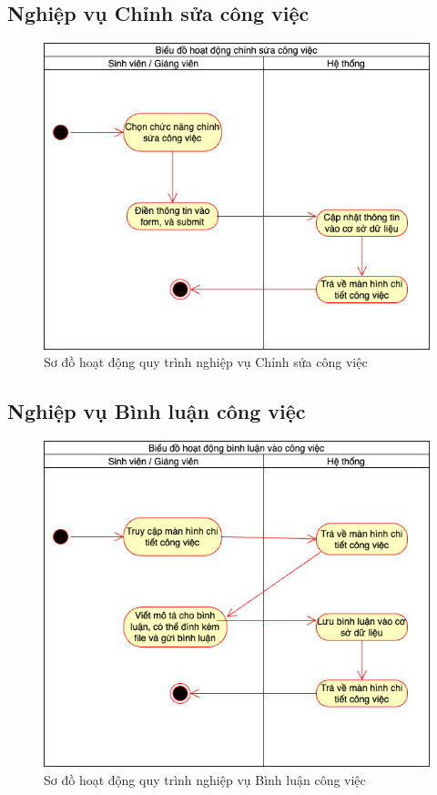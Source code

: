 \documentclass[../Main.tex]{subfiles}
\begin{document}
\subsection{Nghiệp vụ Chỉnh sửa công việc}

\begin{figure}[H]
   \centering
    \includegraphics[width=0.85\linewidth]{Figure/qt_edi_task.png}
    \caption{Sơ đồ hoạt động quy trình nghiệp vụ Chỉnh sửa công việc}
    \label{fig:qt_edi_task}
\end{figure} \newpage
\subsection{Nghiệp vụ Bình luận công việc}
\begin{figure}[H]
   \centering
    \includegraphics[width=0.85\linewidth]{Figure/qt_cmt.png}
    \caption{Sơ đồ hoạt động quy trình nghiệp vụ Bình luận công việc}
    \label{fig:qt_cmt}
\end{figure}
\end{document}
